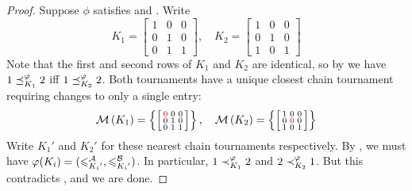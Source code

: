 \begin{proof}
     Suppose $\phi$ satisfies  and
    . Write
    \[
         K_1 = \left[\begin{smallmatrix}
            1 & 0 & 0 \\
            0 & 1 & 0 \\
            0 & 1 & 1
         \end{smallmatrix}\right]
         , \quad
         K_2 = \left[\begin{smallmatrix}
            1 & 0 & 0 \\
            0 & 1 & 0 \\
            1 & 0 & 1
         \end{smallmatrix}\right]
    \]
    Note that the first and second rows of $K_1$ and $K_2$ are identical, so by
     we have $1 \preceq_{K_1}^\varphi 2$ iff $1 \preceq_{K_2}^\varphi 2$.
    Both tournaments have a unique closest chain tournament requiring changes
    to only a single entry:
    \[
        \operatorname{\mathcal{M}}\left({K_1}\right) = \left\{
            \left[\begin{smallmatrix}
               \color{red}{0} & 0 & 0 \\
               0 & 1 & 0 \\
               0 & 1 & 1
            \end{smallmatrix}\right]
        \right\}
        , \quad
        \operatorname{\mathcal{M}}\left({K_2}\right) = \left\{
            \left[\begin{smallmatrix}
               1 & 0 & 0 \\
               0 & \color{red}{0} & 0 \\
               1 & 0 & 1
            \end{smallmatrix}\right]
        \right\}
    \]
    Write ${K_1}'$ and ${K_2}'$ for these nearest chain tournaments
    respectively. By , we must have $\varphi(K_i) =
    ({\leqslant^{\mathcal{A}}_{{K_i}'}}, {\leqslant^{\mathcal{B}}_{{K_i}'}})$. In particular, $1
    \prec_{K_1}^\varphi 2$ and $2 \prec_{K_2}^\varphi 1$. But this contradicts
    , and we are done.


\end{proof}
